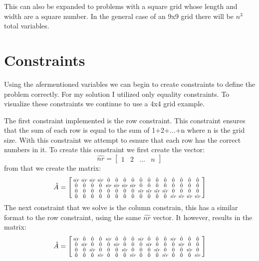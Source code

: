 \documentclass[12pt]{article}
\begin{document}
This can also be expanded to problems with a square grid whose length and width are a square number. In the general case of an 9x9 grid
there will be $n^3$ total variables.

\section{Constraints}
Using the afermentioned variables we can begin to create constraints to define the problem correctly. For my solution I 
utilized only equality constraints. To visualize these constraints we continue to use a 4x4 grid example.

The first constraint implemented is the row constraint. This constraint ensures that the sum of each row is equal to
the sum of 1+2+...+n where n is the grid size. With this constraint we attempt to esnure that each row has the correct numbers in it.
To create this constraint we first create the vector:
$$
\hat{nr} =
\begin{bmatrix}
1 & 2 & \hdots & n
\end{bmatrix}
$$
from that we create the matrix:
$$
\hat{A} =
\begin{bsmallmatrix}
\hat{nr} & \hat{nr} & \hat{nr} & \hat{nr} & \hat{0} & \hat{0} & \hat{0} & \hat{0} & \hat{0} & \hat{0} & \hat{0} & \hat{0} & \hat{0} & \hat{0} & \hat{0} & \hat{0} \\
\hat{0} & \hat{0} & \hat{0} & \hat{0} & \hat{nr} & \hat{nr} & \hat{nr} & \hat{nr} & \hat{0} & \hat{0} & \hat{0} & \hat{0} & \hat{0} & \hat{0} & \hat{0} & \hat{0} \\
\hat{0} & \hat{0} & \hat{0} & \hat{0} & \hat{0} & \hat{0} & \hat{0} & \hat{0} & \hat{nr} & \hat{nr} & \hat{nr} & \hat{nr} & \hat{0} & \hat{0} & \hat{0} & \hat{0} \\
\hat{0} & \hat{0} & \hat{0} & \hat{0} & \hat{0} & \hat{0} & \hat{0} & \hat{0} & \hat{0} & \hat{0} & \hat{0} & \hat{0} & \hat{nr} & \hat{nr} & \hat{nr} & \hat{nr} \\
\end{bsmallmatrix}
$$
The next constraint that we solve is the column constrain, this has a similar format to the row constraint, using the same
$\hat{nr}$ vector. It however, results in the matrix:
$$
\hat{A} =
\begin{bsmallmatrix}
\hat{nr} & \hat{0} & \hat{0} & \hat{0} & \hat{nr} & \hat{0} & \hat{0} & \hat{0} & \hat{nr} & \hat{0} & \hat{0} & \hat{0} & \hat{nr} & \hat{0} & \hat{0} & \hat{0} \\
\hat{0} & \hat{nr} & \hat{0} & \hat{0} & \hat{0} & \hat{nr} & \hat{0} & \hat{0} & \hat{0} & \hat{nr} & \hat{0} & \hat{0} & \hat{0} & \hat{nr} & \hat{0} & \hat{0} \\
\hat{0} & \hat{0} & \hat{nr} & \hat{0} & \hat{0} & \hat{0} & \hat{nr} & \hat{0} & \hat{0} & \hat{0} & \hat{nr} & \hat{0} & \hat{0} & \hat{0} & \hat{nr} & \hat{0} \\
\hat{0} & \hat{0} & \hat{0} & \hat{nr} & \hat{0} & \hat{0} & \hat{0} & \hat{nr} & \hat{0} & \hat{0} & \hat{0} & \hat{nr} & \hat{0} & \hat{0} & \hat{0} & \hat{nr} \\
\end{bsmallmatrix}
$$
\end{document}
